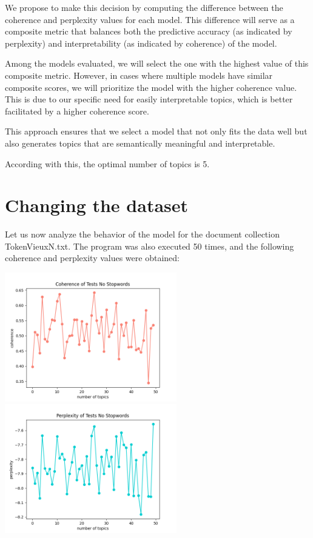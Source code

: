 \documentclass[10pt]{article} %
\begin{document}
	We propose to make this decision by computing the difference between the coherence and perplexity values for each model. This difference will serve as a composite metric that balances both the predictive accuracy (as indicated by perplexity) and interpretability (as indicated by coherence) of the model.
	
	Among the models evaluated, we will select the one with the highest value of this composite metric. However, in cases where multiple models have similar composite scores, we will prioritize the model with the higher coherence value. This is due to our specific need for easily interpretable topics, which is better facilitated by a higher coherence score. 
	
	This approach ensures that we select a model that not only fits the data well but also generates topics that are semantically meaningful and interpretable.
	
	According with this, the optimal number of topics is 5.
	
	\section{Changing the dataset}
	
	Let us now analyze the behavior of the model for the document collection TokenVieuxN.txt. The program was also executed 50 times, and the following coherence and perplexity values were obtained:
	
	\begin{center}
		\includegraphics[width=7.5cm]{images/coherence_no_stopwords_2}
		\includegraphics[width=7.5cm]{images/perplexity_no_stopwords_2}
	\end{center}
	
\end{document}

